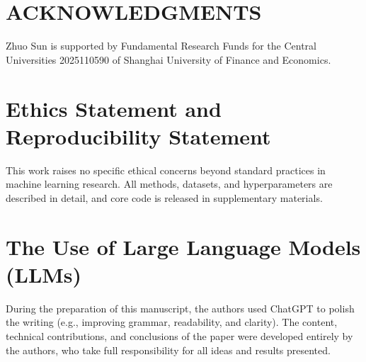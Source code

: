 \documentclass{article} %
\begin{document}
\section*{ACKNOWLEDGMENTS}
Zhuo Sun is supported by Fundamental Research Funds for the Central Universities 2025110590 of Shanghai University of Finance and Economics.

\section*{Ethics Statement and Reproducibility Statement}
This work raises no specific ethical concerns beyond standard practices in machine learning research. All methods, datasets, and hyperparameters are described in detail, and core code is released in supplementary materials.



\clearpage
\appendix

\section*{The Use of Large Language Models (LLMs)}
During the preparation of this manuscript, the authors used ChatGPT to polish the writing (e.g., improving grammar, readability, and clarity). The content, technical contributions, and conclusions of the paper were developed entirely by the authors, who take full responsibility for all ideas and results presented.
\end{document}
